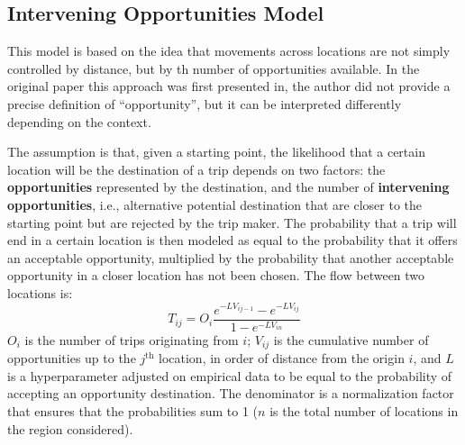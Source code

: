 \subsection{Intervening Opportunities Model}
This model is based on the idea that movements across locations are not simply controlled by distance, but by th number of opportunities available. In the original paper this approach was first presented in, the author did not provide a precise definition of ``opportunity'', but it can be interpreted differently depending on the context.

The assumption is that, given a starting point, the likelihood that a certain location will be the destination of a trip depends on two factors: the \textbf{opportunities} represented by the destination, and the number of \textbf{intervening opportunities}, i.e., alternative potential destination that are closer to the starting point but are rejected by the trip maker. The probability that a trip will end in a certain location is then modeled as equal to the probability that it offers an acceptable opportunity, multiplied by the probability that another acceptable opportunity in a closer location has not been chosen. The flow between two locations is:
\begin{equation*}
    T_{ij} = O_i \frac{e^{-L V_{ij-1}} - e^{-L V_{ij}}}{1 - e^{-L V_{in}}}
\end{equation*}
$O_i$ is the number of trips originating from $i$; $V_{ij}$ is the cumulative number of opportunities up to the $j^{\text{th}}$ location, in order of distance from the origin $i$, and $L$ is a hyperparameter adjusted on empirical data to be equal to the probability of accepting an opportunity destination. The denominator is a normalization factor that ensures that the probabilities sum to 1 ($n$ is the total number of locations in the region considered).

